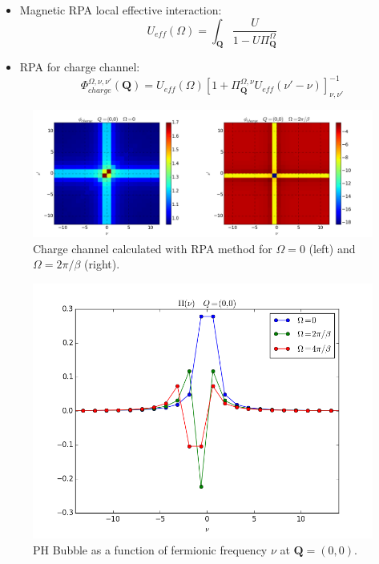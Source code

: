 \begin{itemize}

\item Magnetic RPA local effective interaction:
\begin{equation}
  U_{eff}(\Omega) =\int_{\boldsymbol{Q}} \frac{U}{ 1 - U \Pi^{\Omega}_{\boldsymbol{Q}} }
\end{equation}

\item RPA for charge channel:
\begin{equation}
  \Phi_{charge}^{\Omega,\nu,\nu'}(\boldsymbol{Q}) = U_{eff}(\Omega) 
  \left[ 1+  \Pi^{\Omega,\nu}_{\boldsymbol{Q}} U_{eff}(\nu'-\nu) \right]_{\nu,\nu'}^{-1}
\end{equation}

\end{itemize}

\begin{figure}
\includegraphics[scale=0.25]{images/Perp_ladder_density.png}
\caption{Charge channel calculated with RPA method for $\Omega=0$ (left) and $\Omega=2\pi/\beta$ (right). }
 \label{Perpladder}
\end{figure}

\begin{figure}
\includegraphics[scale=0.7]{images/Bubble_ph.png}
\caption{PH Bubble as a function of fermionic frequency $\nu$ at $\boldsymbol{Q}=(0,0)$. }
 \label{Perpladder}
\end{figure}
